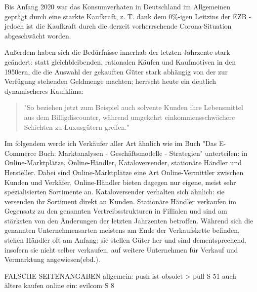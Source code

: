 \iffalse
Einteilung in: Online-Marktplätze + Online-Händler, Intermediäre, Kataloversender, stationäre Händler, Hersteller/Marken \cite{Graf}

entwicklung des kaufprozesses: graf:abbildung; 

https://edoc.sub.uni-hamburg.de/hcu/volltexte/2017/370/pdf/Ebert_Kirsten.pdf Anfang

änderung kaufablauf: \cite{Schaefers}
\fi

Bis Anfang 2020 war das Konsumverhaten in Deutschland im Allgemeinen geprägt durch eine starkte Kaufkraft, z. T. dank dem 0\%-igen Leitzins der \ac{EZB}\cite[S. 49]{Ebert} - jedoch ist die Kaufkraft durch die derzeit vorherrschende Corona-Situation abgeschwächt worden\cite{BfWE}. 

Außerdem haben sich die Bedürfnisse innerhab der letzten Jahrzente stark geändert: statt gleichbleibenden, rationalen Käufen und Kaufmotiven in den 1950ern, die die Auswahl der gekauften Güter stark abhängig von der zur Verfügung stehenden Geldmenge machten\cite[S. 38]{Schramm}; herrscht heute ein deutlich dynamischeres Kaufklima:
\begin{quote}
"So beziehen jetzt zum Beispiel auch solvente Kunden ihre Lebensmittel aus dem Billigdiscounter, während  umgekehrt  einkommensschwächere  Schichten  zu  Luxusgütern  greifen."\cite[S. 43]{Nitt}
\end{quote}

Im folgendem werde ich Verkäufer aller Art ähnlich wie im Buch "Das E-Commerce Buch: Marktanalysen - Geschäftsmodelle - Strategien" unterteilen: in Online-Marktplätze, Online-Händler, Kataloversender, stationäre Händler und Hersteller\cite[S. &15ff]{Graf}. Dabei sind Online-Marktplätze eine Art Online-Vermittler zwischen Kunden und Verkäfer, Online-Händler bieten dagegen nur eigene, meist sehr spezialisierten Sortimente an. Kataloversender verhalten sich ähnlich: sie versenden ihr Sortiment direkt an Kunden. Stationäre Händler verkaufen im Gegensatz zu den genannten Vertreibsstrukturen in Fillialen und sind am stärksten von den Änderungen der letzten Jahrzenten betroffen. Während sich die genannten Unternehmensarten meistens am Ende der Verkaufskette befinden, stehen Händler oft am Anfang: sie stellen Güter her und sind dementsprechend, insofern sie nicht selber verkaufen, auf weitere Unternehmen für Verkauf und Vermarktung angewiesen(ebd.). %

\iffalse FALSCHE SEITENANGABEN 
    allgemein:
        push ist obsolet > pull S 51
        auch ältere kaufen online ein: evilcom S 8
        

